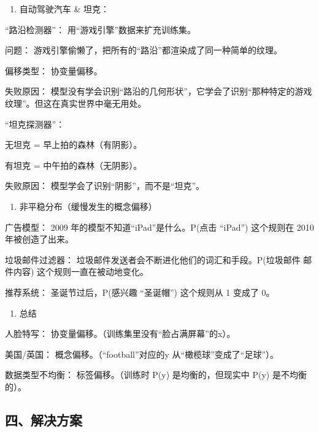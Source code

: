 \begin{enumerate}
\def\labelenumi{\arabic{enumi}.}
\setcounter{enumi}{1}
\tightlist
\item
{}
  自动驾驶汽车 \& 坦克：
\end{enumerate}

``路沿检测器''： 用``游戏引擎''数据来扩充训练集。

问题： 游戏引擎偷懒了，把所有的``路沿''都渲染成了同一种简单的纹理。

偏移类型： 协变量偏移。

失败原因： 模型没有学会识别``路沿的几何形状''，它学会了识别``那种特定的游戏纹理''。但这在真实世界中毫无用处。

``坦克探测器''：

无坦克 = 早上拍的森林（有阴影）。

有坦克 = 中午拍的森林（无阴影）。

失败原因： 模型学会了识别``阴影''，而不是``坦克''。

\begin{enumerate}
\def\labelenumi{\arabic{enumi}.}
\setcounter{enumi}{2}
\tightlist
\item
  非平稳分布（缓慢发生的概念偏移）
\end{enumerate}

广告模型： 2009 年的模型不知道``iPad''是什么。P(点击 \textbar{} ``iPad'') 这个规则在 2010 年被创造了出来。

垃圾邮件过滤器： 垃圾邮件发送者会不断进化他们的词汇和手段。P(垃圾邮件 \textbar{} 邮件内容) 这个规则一直在被动地变化。

推荐系统： 圣诞节过后，P(感兴趣 \textbar{} ``圣诞帽'') 这个规则从 1 变成了 0。

\begin{enumerate}
\def\labelenumi{\arabic{enumi}.}
\setcounter{enumi}{3}
\tightlist
\item
  总结
\end{enumerate}

人脸特写： 协变量偏移。（训练集里没有``脸占满屏幕''的x）。

美国/英国： 概念偏移。（``football''对应的y 从``橄榄球''变成了``足球''）。

数据类型不均衡： 标签偏移。（训练时 P(y) 是均衡的，但现实中 P(y) 是不均衡的）。

\hypertarget{ux56dbux89e3ux51b3ux65b9ux6848}{%
\subsection{四、解决方案}\label{ux56dbux89e3ux51b3ux65b9ux6848}}

